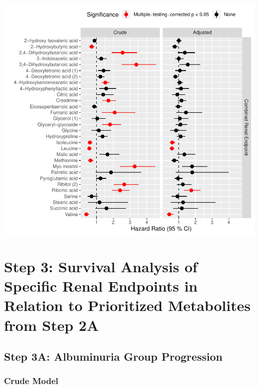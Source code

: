 \documentclass[]{article}
\begin{document}
\includegraphics{0033_PROFIL--Metabolomics_files/figure-latex/Kidney-Surv-Combined-From-All-Forest-1.pdf}

\newpage

\hypertarget{step-3-survival-analysis-of-specific-renal-endpoints-in-relation-to-prioritized-metabolites-from-step-2a}{%
\section{Step 3: Survival Analysis of Specific Renal Endpoints in
Relation to Prioritized Metabolites from Step
2A}\label{step-3-survival-analysis-of-specific-renal-endpoints-in-relation-to-prioritized-metabolites-from-step-2a}}

\hypertarget{step-3a-albuminuria-group-progression}{%
\subsection{Step 3A: Albuminuria Group
Progression}\label{step-3a-albuminuria-group-progression}}

\hypertarget{crude-model-3}{%
\subsubsection{Crude Model}\label{crude-model-3}}
\end{document}
